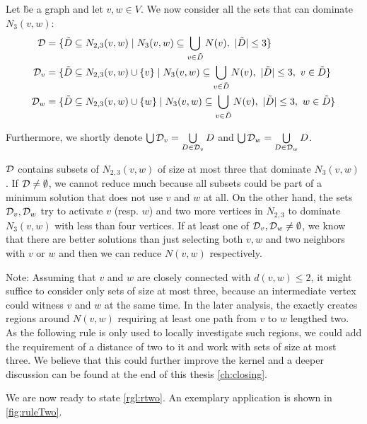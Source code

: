 \begin{definition}\label{def:dvv}
Let \G be a graph and let $v,w \in V$. We now consider all the sets that can dominate $N_3(v,w)$:
\begin{align}
    \mathcal{D} & = \{ \tilde D \subseteq N_{2,3}(v,w)            \mid N_3(v,w) \subseteq \bigcup_{v \in \tilde D} N(v),\ |\tilde D| \leq 3                  \} \\
    \mathcal{D}_{v}  & = \{ \tilde D \subseteq N_{2,3}(v,w) \cup \{v\} \mid N_3(v,w) \subseteq \bigcup_{v \in \tilde D} N(v),\ |\tilde D| \leq 3,\ v \in \tilde D \} \\
    \mathcal{D}_{w}  & = \{ \tilde D \subseteq N_{2,3}(v,w) \cup \{w\} \mid N_3(v,w) \subseteq \bigcup_{v \in \tilde D} N(v),\ |\tilde D| \leq 3,\ w \in \tilde D \}
\end{align}

Furthermore, we shortly denote $\bigcup \mathcal{D}_{v} = \bigcup\limits_{D \in \mathcal{D}_{v}}D $ and $\bigcup \mathcal{D}_{w} = \bigcup\limits_{D \in \mathcal{D}_{w}}D$.
\end{definition}

$\mathcal{D}$ contains subsets of $N_{2,3}(v,w)$ of size at most three that dominate $N_3(v,w)$.
If $\mathcal{D} \neq \emptyset$, we cannot reduce much because all subsets could be part of a minimum solution that does not use $v$ and $w$ at all.
On the other hand, the sets $\mathcal{D}_{v}, \mathcal{D}_{w}$ try to activate $v$ (resp. $w$) and two more vertices in $N_{2,3}$ to dominate $N_3(v,w)$ with less than four vertices.
If at least one of $\mathcal{D}_{v},\mathcal{D}_{w} \neq \emptyset$, we know that there are better solutions than just selecting both $v,w$ and two neighbors with $v$ or $w$ and then we can reduce $N(v,w)$ respectively.

Note: Assuming that $v$ and $w$ are closely connected with $d(v,w) \leq 2$, it might suffice to consider only sets of size at most three, because an intermediate vertex could witness $v$ and $w$ at the same time. 
In the later analysis, the \dreg exactly creates regions around $N(v,w)$ requiring at least one path from $v$ to $w$ lengthed two. 
As the following rule is only used to locally investigate such regions, we could add the requirement of a distance of two to it and work with sets of size at most three. 
We believe that this could further improve the kernel and a deeper discussion can be found at the end of this thesis \cref{ch:closing}.

We are now ready to state \cref{rgl:rtwo}. An exemplary application is shown in \cref{fig:ruleTwo}.

